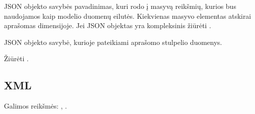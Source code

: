 \documentclass[letterpaper,10pt,lithuanian]{sphinxmanual}
\begin{document}
\begin{fulllineitems}

\pysigstartsignatures
\pysigline
{}
\pysigstopsignatures
\sphinxAtStartPar
JSON objekto savybės pavadinimas, kuri rodo į masyvą reikšmių, kurios bus
naudojamos kaip modelio duomenų eilutės. Kiekvienas masyvo elementas
atskirai aprašomas {\hyperref[\detokenize{formatas:property}]{}} dimensijoje. Jei JSON objektas yra
kompleksinis žiūrėti {\hyperref[\detokenize{formules:kompleksines-strukturos}]{}}.

\end{fulllineitems}



\begin{fulllineitems}

\pysigstartsignatures
\pysigline
{}
\pysigstopsignatures
\sphinxAtStartPar
JSON objekto savybė, kurioje pateikiami aprašomo stulpelio duomenys.

\end{fulllineitems}



\begin{fulllineitems}

\pysigstartsignatures
\pysigline
{}
\pysigstopsignatures
\sphinxAtStartPar
Žiūrėti {\hyperref[\detokenize{formules:kompleksines-strukturos}]{}}.

\end{fulllineitems}



\subsection{XML}
\label{\detokenize{saltiniai:xml}}

\begin{fulllineitems}

\pysigstartsignatures
\pysigline
{}
\pysigstopsignatures
\sphinxAtStartPar
Galimos reikšmės: , .

\end{fulllineitems}
\end{document}
